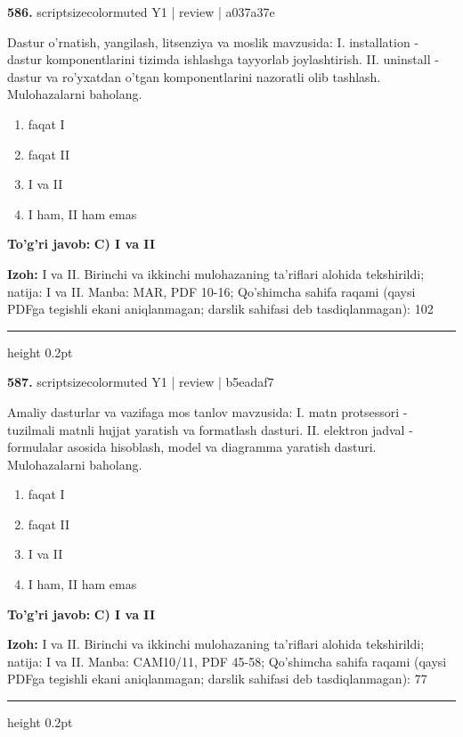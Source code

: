 \documentclass[10pt,a4paper]{article}
\begin{document}
{\bfseries\sffamily\color{ink} 586.} {scriptsizecolor{muted} Y1 | review | a037a37e}
\par
Dastur o'rnatish, yangilash, litsenziya va moslik mavzusida: I. installation - dastur komponentlarini tizimda ishlashga tayyorlab joylashtirish. II. uninstall - dastur va ro'yxatdan o'tgan komponentlarini nazoratli olib tashlash. Mulohazalarni baholang.
\begin{enumerate}[label=\Alph*),leftmargin=9mm]
\item faqat I
\item faqat II
\item I va II
\item I ham, II ham emas
\end{enumerate}
\begin{tcolorbox}[enhanced,breakable,colback=teal!4,colframe=teal!60!black,boxrule=0.45pt,arc=1.2mm,left=2.7mm,right=2.7mm,top=1.8mm,bottom=1.8mm,before skip=2mm,after skip=2mm]
{\bfseries\sffamily\color{teal}To'g'ri javob:} \textbf{C) I va II}
\par\smallskip
{\bfseries Izoh:} I va II. Birinchi va ikkinchi mulohazaning ta'riflari alohida tekshirildi; natija: I va II. Manba: MAR, PDF 10-16; Qo'shimcha sahifa raqami (qaysi PDFga tegishli ekani aniqlanmagan; darslik sahifasi deb tasdiqlanmagan): 102
\end{tcolorbox}
\vspace{2mm}\hrule height 0.2pt\vspace{3mm}

{\bfseries\sffamily\color{ink} 587.} {scriptsizecolor{muted} Y1 | review | b5eadaf7}
\par
Amaliy dasturlar va vazifaga mos tanlov mavzusida: I. matn protsessori - tuzilmali matnli hujjat yaratish va formatlash dasturi. II. elektron jadval - formulalar asosida hisoblash, model va diagramma yaratish dasturi. Mulohazalarni baholang.
\begin{enumerate}[label=\Alph*),leftmargin=9mm]
\item faqat I
\item faqat II
\item I va II
\item I ham, II ham emas
\end{enumerate}
\begin{tcolorbox}[enhanced,breakable,colback=teal!4,colframe=teal!60!black,boxrule=0.45pt,arc=1.2mm,left=2.7mm,right=2.7mm,top=1.8mm,bottom=1.8mm,before skip=2mm,after skip=2mm]
{\bfseries\sffamily\color{teal}To'g'ri javob:} \textbf{C) I va II}
\par\smallskip
{\bfseries Izoh:} I va II. Birinchi va ikkinchi mulohazaning ta'riflari alohida tekshirildi; natija: I va II. Manba: CAM10/11, PDF 45-58; Qo'shimcha sahifa raqami (qaysi PDFga tegishli ekani aniqlanmagan; darslik sahifasi deb tasdiqlanmagan): 77
\end{tcolorbox}
\vspace{2mm}\hrule height 0.2pt\vspace{3mm}
\end{document}
